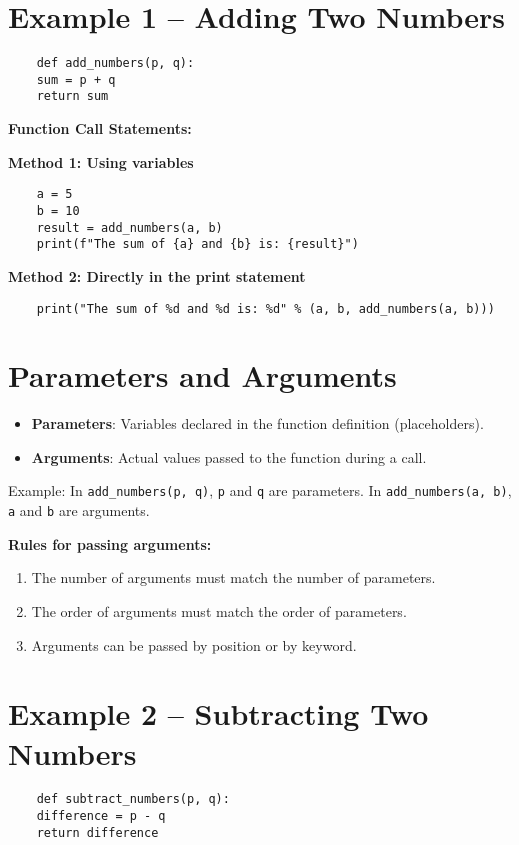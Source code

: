 \section{Example 1 – Adding Two Numbers}
\begin{verbatim}
	def add_numbers(p, q):
	sum = p + q
	return sum
\end{verbatim}

\noindent \textbf{Function Call Statements:}

\textbf{Method 1: Using variables}
\begin{verbatim}
	a = 5
	b = 10
	result = add_numbers(a, b)
	print(f"The sum of {a} and {b} is: {result}")
\end{verbatim}

\textbf{Method 2: Directly in the print statement}
\begin{verbatim}
	print("The sum of %d and %d is: %d" % (a, b, add_numbers(a, b)))
\end{verbatim}

\section{Parameters and Arguments}
\begin{itemize}
	\item \textbf{Parameters}: Variables declared in the function definition (placeholders).
	\item \textbf{Arguments}: Actual values passed to the function during a call.
\end{itemize}

\noindent Example: In \texttt{add\_numbers(p, q)}, \texttt{p} and \texttt{q} are parameters.  
In \texttt{add\_numbers(a, b)}, \texttt{a} and \texttt{b} are arguments.

\noindent \textbf{Rules for passing arguments:}
\begin{enumerate}
	\item The number of arguments must match the number of parameters.
	\item The order of arguments must match the order of parameters.
	\item Arguments can be passed by position or by keyword.
\end{enumerate}

\section{Example 2 – Subtracting Two Numbers}
\begin{verbatim}
	def subtract_numbers(p, q):
	difference = p - q
	return difference
\end{verbatim}

